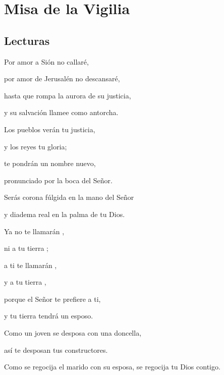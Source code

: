 \chapter{Misa de la Vigilia}

	\section{Lecturas}


		 

		
		\begin{readprose}
			Por amor a Sión no callaré,
			
			por amor de Jerusalén no descansaré,
			
			hasta que rompa la aurora de su justicia,
			
			y su salvación llamee como antorcha.
			
			Los pueblos verán tu justicia,
			
			y los reyes tu gloria;
			
			te pondrán un nombre nuevo,
			
			pronunciado por la boca del Señor.
			
			Serás corona fúlgida en la mano del Señor
			
			y diadema real en la palma de tu Dios.
			
			Ya no te llamarán ,
			
			ni a tu tierra ;
			
			a ti te llamarán ,
			
			y a tu tierra ,
			
			porque el Señor te prefiere a ti,
			
			y tu tierra tendrá un esposo.
			
			Como un joven se desposa con una doncella,
			
			así te desposan tus constructores.
			
			Como se regocija el marido con su esposa, se regocija tu Dios contigo.
		\end{readprose}
	


		 

				

